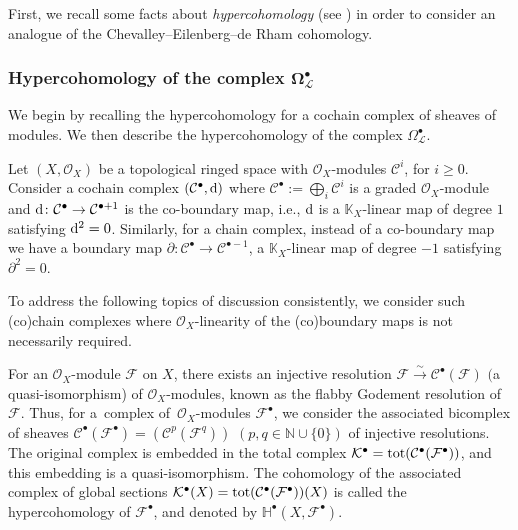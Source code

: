 \documentclass[pdftex]{sigma}
\numberwithin{equation}{section}
\theoremstyle{definition}
\begin{document}
First, we recall some facts about \emph{hypercohomology} (see \cite{UB, VID, CW1}) in order to consider an analogue of the Chevalley--Eilenberg--de Rham cohomology.

\subsubsection[Hypercohomology of the complex Omega\^{}bullet\_L]{Hypercohomology of the complex $\boldsymbol{\Omega^{\bullet}_{\mathcal{L}}}$} \label{Hypercohomology}

We begin by recalling the hypercohomology for a cochain complex of sheaves of modules. We then describe the hypercohomology of the complex $\Omega^{\bullet}_{\mathcal{L}}$.

Let $(X, \mathcal{O}_X)$ be a topological ringed space with $\mathcal{O}_X$-modules $\mathcal{C}^i$, for $i \geq 0$. Consider a cochain complex $(\mathcal{C}^\bullet, {\rm d})$ where $\mathcal{C}^\bullet:= \bigoplus_i \mathcal{C}^i$ is a graded $\mathcal{O}_X$-module and ${\rm d}\colon \mathcal{C}^\bullet \rightarrow \mathcal{C}^{\bullet +1}$ is the co-boundary map, i.e., ${\rm d}$ is a $\mathbb{K}_X$-linear map of degree $1$ satisfying ${\rm d}^2=0$. Similarly, for a chain complex, instead of a co-boundary map we have a boundary map $\partial\colon \mathcal{C}^\bullet \rightarrow \mathcal{C}^{\bullet -1}$, a $\mathbb{K}_X$-linear map of degree $-1$ satisfying $\partial^2=0$.

To address the following topics of discussion consistently, we consider such (co)chain complexes where $\mathcal{O}_X$-linearity of the (co)boundary maps is not necessarily required.

For an $\mathcal{O}_X$-module $\mathcal{F}$ on $X$, there exists an injective resolution $\mathcal{F} \overset{\sim}{\rightarrow} \mathcal{C}^\bullet(\mathcal{F})$ $($a quasi-isomorphism) of $\mathcal{O}_X$-modules, known as the flabby Godement resolution of $\mathcal{F}$. Thus, for a~complex of~$\mathcal{O}_X$-modules $\mathcal{F}^\bullet$, we consider the associated bicomplex of sheaves $\mathcal{C}^\bullet(\mathcal{F}^\bullet)=(\mathcal{C}^p(\mathcal{F}^q))$ $(p,q \in \mathbb{N} \cup \{0\})$ of injective resolutions. The original complex is embedded in the total complex $\mathcal{K}^\bullet= {\rm tot}(\mathcal{C}^\bullet(\mathcal{F}^\bullet))$, and this embedding is a quasi-isomorphism. The cohomology of the associated complex of global sections $\mathcal{K}^\bullet(X)={\rm tot}(\mathcal{C}^\bullet(\mathcal{F}^\bullet))(X)$ is called the hypercohomology of $\mathcal{F}^\bullet$, and denoted by $\mathbb{H}^\bullet(X, \mathcal{F}^\bullet)$.
\end{document}
